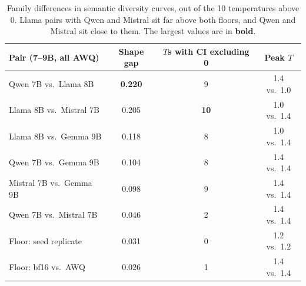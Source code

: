 \begin{table}[t]
    \centering
    \begin{tabular}{@{}lccc@{}}
        \toprule
        \textbf{Pair (7--9B, all AWQ)} & \textbf{Shape gap} & \textbf{$T$s with CI excluding 0} & \textbf{Peak $T$} \\
        \midrule
        Qwen 7B vs.\ Llama 8B & {\bf 0.220} & 9 & 1.4 vs.\ 1.0 \\
        Llama 8B vs.\ Mistral 7B & 0.205 & {\bf 10} & 1.0 vs.\ 1.4 \\
        Llama 8B vs.\ Gemma 9B & 0.118 & 8 & 1.0 vs.\ 1.4 \\
        Qwen 7B vs.\ Gemma 9B & 0.104 & 8 & 1.4 vs.\ 1.4 \\
        Mistral 7B vs.\ Gemma 9B & 0.098 & 9 & 1.4 vs.\ 1.4 \\
        Qwen 7B vs.\ Mistral 7B & 0.046 & 2 & 1.4 vs.\ 1.4 \\
        \midrule
        Floor: seed replicate & 0.031 & 0 & 1.2 vs.\ 1.2 \\
        Floor: bf16 vs.\ AWQ & 0.026 & 1 & 1.4 vs.\ 1.4 \\
        \bottomrule
    \end{tabular}
    \caption{Family differences in semantic diversity curves, out of the 10 temperatures above 0. Llama pairs with Qwen and Mistral sit far above both floors, and Qwen and Mistral sit close to them. The largest values are in \textbf{bold}.}
    \label{tab:family}
\end{table}
